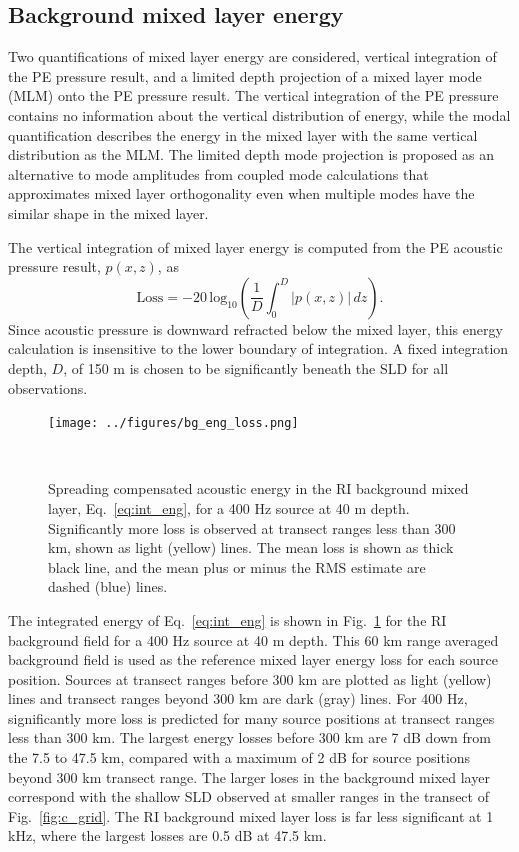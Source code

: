 \documentclass[preprint,NumberedRefs]{JASA}
\begin{document}
\subsection{Background mixed layer energy}\label{ssec:bg}
Two quantifications of mixed layer energy are considered, vertical integration of the PE pressure result, and a limited depth projection of a mixed layer mode (MLM) onto the PE pressure result. The vertical integration of the PE pressure contains no information about the vertical distribution of energy, while the modal quantification describes the energy in the mixed layer with the same vertical distribution as the MLM. The limited depth mode projection is proposed as an alternative to mode amplitudes from coupled mode calculations that approximates mixed layer orthogonality even when multiple modes have the similar shape in the mixed layer.

The vertical integration of mixed layer energy is computed from the PE acoustic pressure result, $p(x, z)$, as
\begin{equation}
    \textrm{Loss} = -20 \, \textrm{log}_{10} \left( \frac{1}{D} \int^{D}_0 \left| p(x, z) \right| \,  dz \right).
    \label{eq:int_eng}
\end{equation}
Since acoustic pressure is downward refracted below the mixed layer, this energy calculation is insensitive to the lower boundary of integration. A fixed integration depth, $D$, of 150 m is chosen to be significantly beneath the SLD for all observations.

\begin{figure}
\texttt{[image: ../figures/bg\_eng\_loss.png]}
    \caption{Spreading compensated acoustic energy in the RI background mixed layer, Eq.~\eqref{eq:int_eng}, for a 400 Hz source at 40 m depth. Significantly more loss is observed at transect ranges less than 300 km, shown as light (yellow) lines. The mean loss is shown as thick black line, and the mean plus or minus the RMS estimate are dashed (blue) lines.}
    \label{fig:bg_eng}
\end{figure}
The integrated energy of Eq.~\eqref{eq:int_eng} is shown in Fig.~\ref{fig:bg_eng} for the RI background field for a 400 Hz source at 40 m depth. This 60 km range averaged background field is used as the reference mixed layer energy loss for each source position. Sources at transect ranges before 300 km are plotted as light (yellow) lines and transect ranges beyond 300 km are dark (gray) lines. For 400 Hz, significantly more loss is predicted for many source positions at transect ranges less than 300 km. The largest energy losses before 300 km are 7 dB down from the 7.5 to 47.5 km, compared with a maximum of 2 dB for source positions beyond 300 km transect range. The larger loses in the background mixed layer correspond with the shallow SLD observed at smaller ranges in the transect of Fig.~\ref{fig:c_grid}. The RI background mixed layer loss is far less significant at 1 kHz, where the largest losses are 0.5 dB at 47.5 km.
\end{document}
